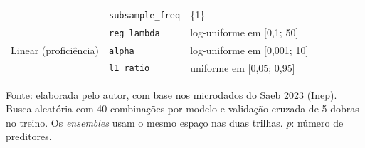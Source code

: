 \begin{table}[H]
\begin{tabular}{L{3.4cm}L{4.0cm}L{6.6cm}}
         & \texttt{subsample\_freq} & \{1\} \\
         & \texttt{reg\_lambda} & log-uniforme em [0,1; 50] \\
        \addlinespace
        Linear (proficiência) & \texttt{alpha} & log-uniforme em [0,001; 10] \\
         & \texttt{l1\_ratio} & uniforme em [0,05; 0,95] \\
        \bottomrule
    \end{tabular}
    \vspace{0.1cm}
    \begin{flushleft}
    {\footnotesize Fonte: elaborada pelo autor, com base nos microdados do Saeb 2023 (Inep). Busca aleatória com 40 combinações por modelo e validação cruzada de 5 dobras no treino. Os \textit{ensembles} usam o mesmo espaço nas duas trilhas. $p$: número de preditores.}
    \end{flushleft}
    \label{tab:ap-espacos}
\end{table}
